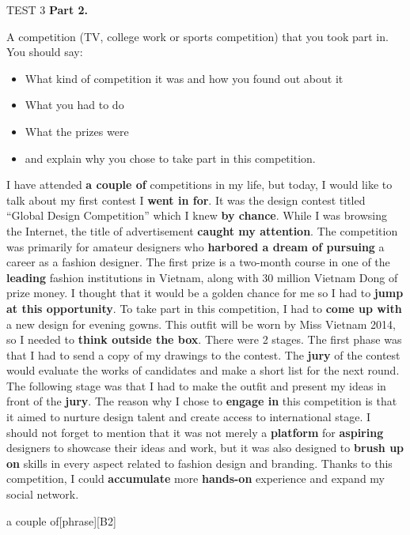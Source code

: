 \begin{glossarymc}[Cambridge 7]
\begin{test}{TEST 3}
    \noindent
    \textbf{Part 2.}
    \begin{qa}{A competition (TV, college work or sports competition) that you took part in. You should say:}
    \begin{itemize}
    \item What kind of competition it was and how you found out about it
    \item What you had to do
    \item What the prizes were
    \item and explain why you chose to take part in this competition.
    \end{itemize}
    
    I have attended \textbf{a couple of} competitions in my life, but today, I would like to talk about my first contest I \textbf{went in for}. It was the design contest titled “Global Design Competition” which I knew \textbf{by chance}. While I was browsing the Internet, the title of advertisement \textbf{caught my attention}. The competition was primarily for amateur designers who \textbf{harbored a dream of pursuing} a career as a fashion designer. The first prize is a two-month course in one of the \textbf{leading} fashion institutions in Vietnam, along with 30 million Vietnam Dong of prize money. I thought that it would be a golden chance for me so I had to \textbf{jump at this opportunity}. To take part in this competition, I had to \textbf{come up with} a new design for evening gowns. This outfit will be worn by Miss Vietnam 2014, so I needed to \textbf{think outside the box}. There were 2 stages. The first phase was that I had to send a copy of my drawings to the contest. The \textbf{jury} of the contest would evaluate the works of candidates and make a short list for the next round. The following stage was that I had to make the outfit and present my ideas in front of the \textbf{jury}. The reason why I chose to \textbf{engage in} this competition is that it aimed to nurture design talent and create access to international stage. I should not forget to mention that it was not merely a \textbf{platform} for \textbf{aspiring} designers to showcase their ideas and work, but it was also designed to \textbf{brush up on} skills in every aspect related to fashion design and branding. Thanks to this competition, I could \textbf{accumulate} more \textbf{hands-on} experience and expand my social network.
    \end{qa}

        \begin{VocabExplain}[Part 2]
            \begin{ExplainCard}{a couple of}[phrase][B2]
            \end{ExplainCard}


\end{VocabExplain}
\end{test}
\end{glossarymc}
